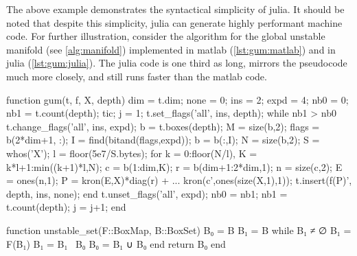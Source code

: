 The above example demonstrates the syntactical simplicity of julia. 
It should be noted that despite this simplicity, julia can generate highly performant 
machine code. For further illustration, consider the algorithm for the global unstable 
manifold (see \autoref{alg:manifold}) implemented in matlab (\autoref{lst:gum:matlab}) 
and in julia (\autoref{lst:gum:julia}). The julia code is one third as long, mirrors 
the pseudocode much more closely, and still runs faster than the matlab code.

\begin{jllisting}[float, language=matlab, style=jlcodestyle, label=lst:gum:matlab, caption=Unstable manifold algorithm in matlab]
    function gum(t, f, X, depth)
    dim = t.dim;
    none = 0; ins = 2; expd = 4;             %
    nb0 = 0;  nb1 = t.count(depth);          %
    tic; j = 1;
    t.set_flags('all', ins, depth);
    while nb1 > nb0                          %
    t.change_flags('all', ins, expd);        %
    b = t.boxes(depth); M = size(b,2);       %
    flags = b(2*dim+1, :); 
    I = find(bitand(flags,expd));            %
    b = b(:,I); N = size(b,2);
    S = whos('X'); l = floor(5e7/S.bytes);
    for k = 0:floor(N/l),                    %
        K = k*l+1:min((k+1)*l,N);
        c = b(1:dim,K);                      %
        r = b(dim+1:2*dim,1);                %
        n = size(c,2); E = ones(n,1);
        P = kron(E,X)*diag(r) + ...          %
            kron(c',ones(size(X,1),1));
        t.insert(f(P)', depth, ins, none);   %
    end
    t.unset_flags('all', expd);              %
    nb0 = nb1; nb1 = t.count(depth);
    j = j+1;
    end
\end{jllisting}

\begin{jllisting}[float, language=julia, style=jlcodestyle, label=lst:gum:julia, caption=Unstable manifold algorithm in julia]
    function unstable_set(F::BoxMap, B::BoxSet)
        B₀ = B
        B₁ = B
        while B₁ ≠ ∅
            B₁ = F(B₁)
            B₁ = B₁ \ B₀
            B₀ = B₁ ∪ B₀
        end
        return B₀
    end
\end{jllisting}



